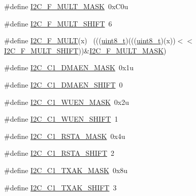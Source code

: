 \begin{DoxyCompactItemize}
\item 
\#define \hyperlink{group___i2_c___register___masks_ga9e077caa9ac07c03f5e34e431d0806fa}{I2\+C\+\_\+\+F\+\_\+\+M\+U\+L\+T\+\_\+\+M\+A\+SK}~0x\+C0u
\item 
\#define \hyperlink{group___i2_c___register___masks_ga3a338cb3af4c140fde82427d091d5b4a}{I2\+C\+\_\+\+F\+\_\+\+M\+U\+L\+T\+\_\+\+S\+H\+I\+FT}~6
\item 
\#define \hyperlink{group___i2_c___register___masks_ga49d79434c3f1d51dce271f7100559aea}{I2\+C\+\_\+\+F\+\_\+\+M\+U\+LT}(x)                                                    ~(((\hyperlink{_p_e___types_8h_aba7bc1797add20fe3efdf37ced1182c5}{uint8\+\_\+t})(((\hyperlink{_p_e___types_8h_aba7bc1797add20fe3efdf37ced1182c5}{uint8\+\_\+t})(x))$<$$<$\hyperlink{group___i2_c___register___masks_ga3a338cb3af4c140fde82427d091d5b4a}{I2\+C\+\_\+\+F\+\_\+\+M\+U\+L\+T\+\_\+\+S\+H\+I\+FT}))\&\hyperlink{group___i2_c___register___masks_ga9e077caa9ac07c03f5e34e431d0806fa}{I2\+C\+\_\+\+F\+\_\+\+M\+U\+L\+T\+\_\+\+M\+A\+SK})
\item 
\#define \hyperlink{group___i2_c___register___masks_gadfd8fccdd35a4944a1e53ffa26e5d06b}{I2\+C\+\_\+\+C1\+\_\+\+D\+M\+A\+E\+N\+\_\+\+M\+A\+SK}~0x1u
\item 
\#define \hyperlink{group___i2_c___register___masks_ga1cd5f87cc18a56d293697f0463e2a9e3}{I2\+C\+\_\+\+C1\+\_\+\+D\+M\+A\+E\+N\+\_\+\+S\+H\+I\+FT}~0
\item 
\#define \hyperlink{group___i2_c___register___masks_ga708d3eded28946d6f2e4b7ed5aff8fe8}{I2\+C\+\_\+\+C1\+\_\+\+W\+U\+E\+N\+\_\+\+M\+A\+SK}~0x2u
\item 
\#define \hyperlink{group___i2_c___register___masks_gad1bec740751b47fd0f4e02d913c3b287}{I2\+C\+\_\+\+C1\+\_\+\+W\+U\+E\+N\+\_\+\+S\+H\+I\+FT}~1
\item 
\#define \hyperlink{group___i2_c___register___masks_ga656f6747e8edc8299767365ea1ac9d70}{I2\+C\+\_\+\+C1\+\_\+\+R\+S\+T\+A\+\_\+\+M\+A\+SK}~0x4u
\item 
\#define \hyperlink{group___i2_c___register___masks_gac6c61e0bd2615da3bbc3079984192dd7}{I2\+C\+\_\+\+C1\+\_\+\+R\+S\+T\+A\+\_\+\+S\+H\+I\+FT}~2
\item 
\#define \hyperlink{group___i2_c___register___masks_gaebf88a6e1a433272e606980474b4e577}{I2\+C\+\_\+\+C1\+\_\+\+T\+X\+A\+K\+\_\+\+M\+A\+SK}~0x8u
\item 
\#define \hyperlink{group___i2_c___register___masks_ga95ea65244938ce40ca695f5193268357}{I2\+C\+\_\+\+C1\+\_\+\+T\+X\+A\+K\+\_\+\+S\+H\+I\+FT}~3
\item 
$$
\end{DoxyCompactItemize}
